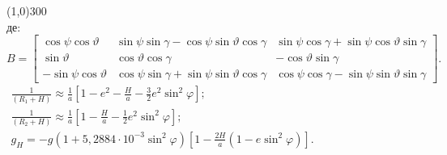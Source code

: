 \documentclass[ucs,compress]{beamer}    %
\begin{document}
\begin{frame}[plain]
{\centering \line(1,0){300}\\}
де: \\
$\label{eq:bmatrix}
B=\left[\begin{array}{ccc} 
{\cos \psi \cos \vartheta } & 
{\sin \psi \sin \gamma -\cos \psi \sin \vartheta \cos \gamma } & 
{\sin \psi \cos \gamma +\sin \psi \cos \vartheta \sin \gamma } \\ 
{\sin \vartheta } & {\cos \vartheta \cos \gamma } & 
{-\cos \vartheta \sin \gamma } \\ 
{-\sin \psi \cos \vartheta } & 
{\cos \psi \sin \gamma +\sin \psi \sin \vartheta \cos \gamma } & 
{\cos \psi \cos \gamma -\sin \psi\sin \vartheta \sin \gamma } 
\end{array}\right]. 
$\\
\vspace{3mm}
$\label{eq:gravity} 
\begin{array}{l}{\frac{1}{(R_{1} +H)} \approx \frac{1}{a}\left[1-e^{2} -\frac{H}{a} -\frac{3}{2} e^{2} \sin ^{2} \varphi\right];} \\ 
{\frac{1}{(R_{2} +H)} \approx \frac{1}{a} \left[1-\frac{H}{a} -\frac{1}{2} e^{2} \sin ^{2}\varphi\right]  ;} \\ 
{g_{H} =-g\left(1+5,2884\cdot 10^{-3} \sin ^{2}\varphi \right)\left[1-\frac{2H}{a} \left(1-e\sin ^{2}\varphi \right)\right].} 
\end{array}$
\end{frame}

\end{document}
